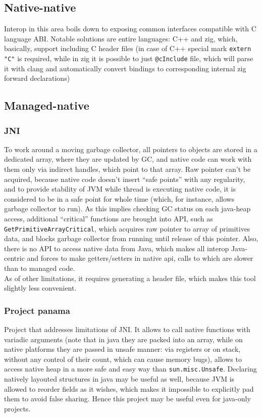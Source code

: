 \documentclass[times, %
               specification,annotation, %
               titlepage-extra-ru,specification-extra-ru,annotation-extra-ru, %
               languages={russian,english} %
              ]{itmo-student-thesis}
\begin{document}
\subsection{Native-native}
Interop in this area boils down to exposing common interfaces compatible with C language ABI. Notable solutions are entire languages: C++ and zig, which, basically, support including C header files (in case of C++ special mark \texttt{extern "C"} is required, while in zig it is possible to just \texttt{@cInclude} file, which will parse it with clang and automatically convert bindings to corresponding internal zig forward declarations)

\subsection{Managed-native}
\subsubsection{JNI}
To work around a moving garbage collector, all pointers to objects are stored in a dedicated array, where they are updated by GC, and native code can work with them only via indirect handles, which point to that array. Raw pointer can't be acquired, because native code doesn't insert ``safe points'' with any regularity, and to provide stability of JVM while thread is executing native code, it is considered to be in a safe point for whole time (which, for instance, allows garbage collector to run). As this implies checking GC status on each java-heap access, additional ``critical'' functions are brought into API, such as \texttt{GetPrimitiveArrayCritical}, which acquires raw pointer to array of primitives data, and blocks garbage collector from running until release of this pointer. Also, there is no API to access native data from Java, which makes all interop Java-centric and forces to make getters/setters in native api, calls to which are slower than to managed code.\\
As of other limitations, it requires generating a header file, which makes this tool slightly less convenient.
\subsubsection{Project panama}
Project that addresses limitations of JNI. It allows to call native functions with variadic arguments (note that in java they are packed into an array, while on native platforms they are passed in unsafe manner: via registers or on stack, without any control of their count, which can cause memory bugs), allows to access native heap in a more safe and easy way than \texttt{sun.misc.Unsafe}. Declaring natively layouted structures in java may be useful as well, because JVM is allowed to reorder fields as it wishes, which makes it impossible to explicitly pad them to avoid false sharing. Hence this project may be useful even for java-only projects.
\end{document}
